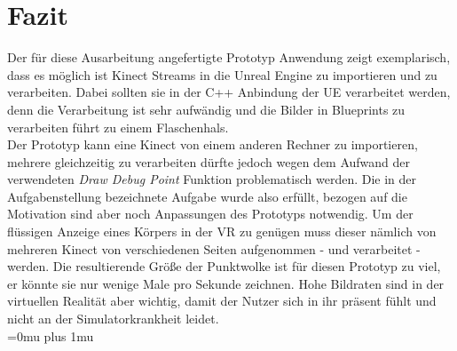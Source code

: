 \documentclass[a4paper]{IEEEtran}
\begin{document}
\section{Fazit}
	Der für diese Ausarbeitung angefertigte Prototyp Anwendung zeigt exemplarisch, dass es möglich ist Kinect Streams in die Unreal Engine zu importieren und zu verarbeiten.
	Dabei sollten sie in der C++ Anbindung der UE verarbeitet werden, denn die Verarbeitung ist sehr aufwändig und die Bilder in Blueprints zu verarbeiten führt zu einem Flaschenhals.\\
	Der Prototyp kann eine Kinect von einem anderen Rechner zu importieren, mehrere gleichzeitig zu verarbeiten dürfte jedoch wegen dem Aufwand der verwendeten {\textit{Draw Debug Point}} Funktion problematisch werden. 
	Die in der Aufgabenstellung bezeichnete Aufgabe wurde also erfüllt, bezogen auf die Motivation sind aber noch Anpassungen des Prototyps notwendig.
	Um der flüssigen Anzeige eines Körpers in der VR zu genügen muss dieser nämlich von mehreren Kinect von verschiedenen Seiten aufgenommen - und verarbeitet - werden. 
	Die resultierende Größe der Punktwolke ist für diesen Prototyp zu viel, er könnte sie nur wenige Male pro Sekunde zeichnen. 
	Hohe Bildraten sind in der virtuellen Realität aber wichtig, damit der Nutzer sich in ihr präsent fühlt und nicht an der Simulatorkrankheit leidet. \\[0.5cm]
	

	


\Urlmuskip=0mu plus 1mu\relax


\end{document}
